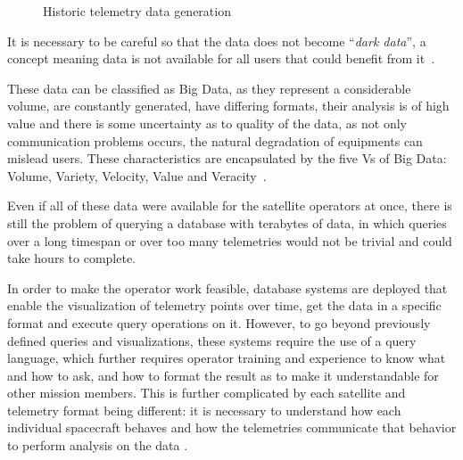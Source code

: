 \begin{figure}[!htb]
  \caption{Historic telemetry data generation}\label{fig:totaldatagen}
  \vspace{4mm}
  \begin{center}
  \end{center}
  \vspace{2mm}
\end{figure}

It is necessary to be careful so that the data does not become ``\textit{dark data}'', a concept meaning data is not available for all users that could benefit from it~\cite{heidornSheddingLightDark2008}.

These data can be classified as Big Data, as they represent a considerable volume, are constantly generated, have differing formats, their analysis is of high value and there is some uncertainty as to quality of the data, as not only communication problems occurs, the natural degradation of equipments can mislead users.
These characteristics are encapsulated by the five Vs of Big Data: Volume, Variety, Velocity, Value and Veracity~\cite{kacfahemaniUnderstandableBigData2015}.

Even if all of these data were available for the satellite operators at once, there is still the problem of querying a database with terabytes of data, in which queries over a long timespan or over too many telemetries would not be trivial and could take hours to complete.

In order to make the operator work feasible, database systems are deployed that enable the visualization of telemetry points over time, get the data in a specific format and execute query operations on it.
However, to go beyond previously defined queries and visualizations, these systems require the use of a query language, which further requires operator training and experience to know what and how to ask, and how to format the result as to make it understandable for other mission members.
This is further complicated by each satellite and telemetry format being different: it is necessary to understand how each individual spacecraft behaves and how the telemetries communicate that behavior to perform analysis on the data \cite{uhligSpacecraftOperations2015}.


